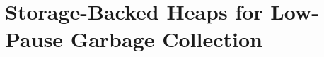 


\chapter{Storage-Backed Heaps for Low-Pause Garbage Collection}
\label{chapter:chipper}

      
%
%  
%



